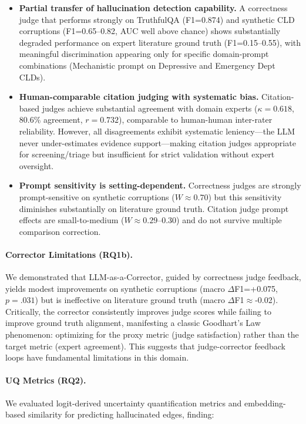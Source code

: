 \begin{itemize}[noitemsep]
    \item \textbf{Partial transfer of hallucination detection capability.} A correctness judge that performs strongly on TruthfulQA (F1=0.874) and synthetic CLD corruptions (F1=0.65--0.82, AUC well above chance) shows substantially degraded performance on expert literature ground truth (F1=0.15--0.55), with meaningful discrimination appearing only for specific domain-prompt combinations (Mechanistic prompt on Depressive and Emergency Dept CLDs).
    
    \item \textbf{Human-comparable citation judging with systematic bias.} Citation-based judges achieve substantial agreement with domain experts ($\kappa=0.618$, 80.6\% agreement, $r=0.732$), comparable to human-human inter-rater reliability. However, all disagreements exhibit systematic leniency---the LLM never under-estimates evidence support---making citation judges appropriate for screening/triage but insufficient for strict validation without expert oversight.
    
    \item \textbf{Prompt sensitivity is setting-dependent.} Correctness judges are strongly prompt-sensitive on synthetic corruptions ($W\approx0.70$) but this sensitivity diminishes substantially on literature ground truth. Citation judge prompt effects are small-to-medium ($W\approx0.29$--0.30) and do not survive multiple comparison correction.
\end{itemize}

\paragraph{Corrector Limitations (RQ1b).}
We demonstrated that LLM-as-a-Corrector, guided by correctness judge feedback, yields modest improvements on synthetic corruptions (macro $\Delta$F1=+0.075, $p=.031$) but is ineffective on literature ground truth (macro $\Delta$F1$\approx$-0.02). Critically, the corrector consistently improves judge scores while failing to improve ground truth alignment, manifesting a classic Goodhart's Law phenomenon: optimizing for the proxy metric (judge satisfaction) rather than the target metric (expert agreement). This suggests that judge-corrector feedback loops have fundamental limitations in this domain.

\paragraph{UQ Metrics (RQ2).}
We evaluated logit-derived uncertainty quantification metrics and embedding-based similarity for predicting hallucinated edges, finding:

